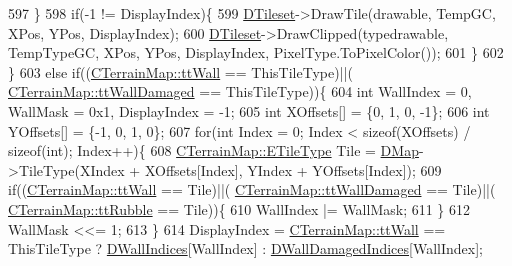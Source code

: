 \begin{DoxyCode}
{{{{{{{{597                     \}
598                     \textcolor{keywordflow}{if}(-1 != DisplayIndex)\{
599                         \hyperlink{classCMapRenderer_ace0648cba050b5e02431096edd15b836}{DTileset}->DrawTile(drawable, TempGC, XPos, YPos, DisplayIndex);
600                         \hyperlink{classCMapRenderer_ace0648cba050b5e02431096edd15b836}{DTileset}->DrawClipped(typedrawable, TempTypeGC, XPos, YPos, DisplayIndex, 
      PixelType.ToPixelColor());
601                     \}
602                 \}
603                 \textcolor{keywordflow}{else} \textcolor{keywordflow}{if}((\hyperlink{classCTerrainMap_aff2ab991e237269941416dd79d8871d4a9faa5ddca496d71c34b9d01157de34b2}{CTerrainMap::ttWall} == ThisTileType)||(
      \hyperlink{classCTerrainMap_aff2ab991e237269941416dd79d8871d4acbd754bea3ab1493a28f3a67596482dd}{CTerrainMap::ttWallDamaged} == ThisTileType))\{
604                     \textcolor{keywordtype}{int} WallIndex = 0, WallMask = 0x1, DisplayIndex = -1;
605                     \textcolor{keywordtype}{int} XOffsets[] = \{0, 1, 0, -1\};
606                     \textcolor{keywordtype}{int} YOffsets[] = \{-1, 0, 1, 0\};
607                     \textcolor{keywordflow}{for}(\textcolor{keywordtype}{int} Index = 0; Index < \textcolor{keyword}{sizeof}(XOffsets) / \textcolor{keyword}{sizeof}(\textcolor{keywordtype}{int}); Index++)\{
608                         \hyperlink{classCTerrainMap_aff2ab991e237269941416dd79d8871d4}{CTerrainMap::ETileType} Tile = \hyperlink{classCMapRenderer_ab9a199c61aa1c87a3248af3085d8ba52}{DMap}->TileType(XIndex + 
      XOffsets[Index], YIndex + YOffsets[Index]);
609                         \textcolor{keywordflow}{if}((\hyperlink{classCTerrainMap_aff2ab991e237269941416dd79d8871d4a9faa5ddca496d71c34b9d01157de34b2}{CTerrainMap::ttWall} == Tile)||(
      \hyperlink{classCTerrainMap_aff2ab991e237269941416dd79d8871d4acbd754bea3ab1493a28f3a67596482dd}{CTerrainMap::ttWallDamaged} == Tile)||(
      \hyperlink{classCTerrainMap_aff2ab991e237269941416dd79d8871d4a0969ea4c56acb3f5acf137c0d06a3371}{CTerrainMap::ttRubble} == Tile))\{
610                             WallIndex |= WallMask;
611                         \}
612                         WallMask <<= 1;
613                     \}
614                     DisplayIndex = \hyperlink{classCTerrainMap_aff2ab991e237269941416dd79d8871d4a9faa5ddca496d71c34b9d01157de34b2}{CTerrainMap::ttWall} == ThisTileType ? 
      \hyperlink{classCMapRenderer_a5ba880d6fb399fc678321cb1daa2e856}{DWallIndices}[WallIndex] : \hyperlink{classCMapRenderer_a032989788e978e11147ab8603d875771}{DWallDamagedIndices}[WallIndex];
}}}}}}}}
\end{DoxyCode}
